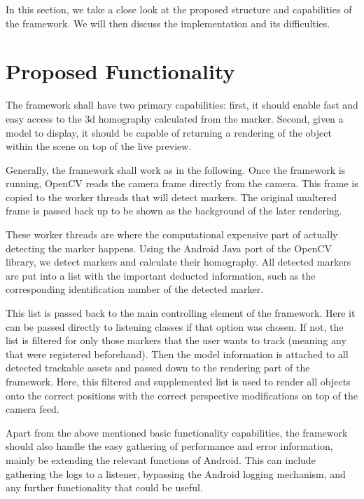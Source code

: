 In this section, we take a close look at the proposed structure and capabilities of the framework.
We will then discuss the implementation and its difficulties.

\section{Proposed Functionality}

The framework shall have two primary capabilities: first, it should enable fast and easy access to the 3d homography calculated from the marker.
Second, given a model to display, it should be capable of returning a rendering of the object within the scene on top of the live preview.

Generally, the framework shall work as in the following.
Once the framework is running, OpenCV reads the camera frame directly from the camera.
This frame is copied to the worker threads that will detect markers.
The original unaltered frame is passed back up to be shown as the background of the later rendering.

These worker threads are where the computational expensive part of actually detecting the marker happens.
Using the Android Java port of the OpenCV library, we detect markers and calculate their homography.
All detected markers are put into a list with the important deducted information, such as the corresponding identification number of the detected marker.

This list is passed back to the main controlling element of the framework.
Here it can be passed directly to listening classes if that option was chosen.
If not, the list is filtered for only those markers that the user wants to track (meaning any that were registered beforehand).
Then the model information is attached to all detected trackable assets and passed down to the rendering part of the framework.
Here, this filtered and supplemented list is used to render all objects onto the correct positions with the correct perspective modifications on top of the camera feed.

Apart from the above mentioned basic functionality capabilities, the framework should also handle the easy gathering of performance and error information, mainly be extending the relevant functions of Android.
This can include gathering the logs to a listener, bypassing the Android logging mechanism, and any further functionality that could be useful.

